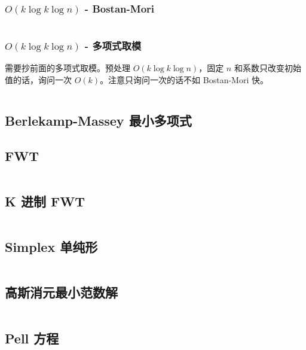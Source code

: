 \documentclass[titlepage, a4paper, 11pt]{article}
\begin{document}
\begin{spacing}{1.15}
					\subsubsection*{$O(k \log k \log n)$ - Bostan-Mori}
						\inputminted{cpp}{src/Math/快速线性递推-bostan-mori.cpp}
					\subsubsection*{$O(k \log k \log n)$ - 多项式取模}
						需要抄前面的多项式取模。预处理 $O(k \log k \log n)$，固定 $n$ 和系数只改变初始值的话，询问一次 $O(k)$。注意只询问一次的话不如 Bostan-Mori 快。
						\inputminted{cpp}{src/Math/快速线性递推-多项式取模.cpp}
				\subsection{Berlekamp-Massey 最小多项式}
					
				\subsection{FWT}
					\inputminted{cpp}{src/Math/FWT.cpp}
				\subsection{K 进制 FWT}
					\inputminted{cpp}{src/tbr/fwt.cpp}
				\subsection{Simplex 单纯形}
					\inputminted{cpp}{src/Math/Simplex.cpp}
				\subsection{高斯消元最小范数解}
					\inputminted{cpp}{src/Geometry/minnorm_gauss.cpp}
				\subsection{Pell 方程}
					\inputminted{cpp}{src/Math/Pell方程.cpp}

\end{spacing}
\end{document}
